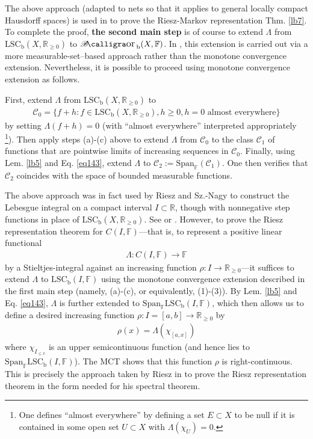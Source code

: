 \documentclass[12pt,b5paper,notitlepage]{article}
\theoremstyle{definition}
\theoremstyle{plain}
\DeclareMathOperator{\Borb}{{\mathscr{B}\text{\kern -2pt {\calligra\large or}}\,}_{\mathrm b}}
\newcommand{\Span}{\mathrm{Span}}
\newcommand{\scr}{\mathscr}
\newcommand{\Rbb}{\mathbb R}
\newcommand{\Fbb}{\mathbb F}
\newcommand{\LSCb}{\mathrm{LSC}_{\mathrm b}}
\numberwithin{equation}{section}
\begin{document}
The above approach (adapted to nets so that it applies to general locally compact Hausdorff spaces) is used in \cite[Ch. 25]{Gui-A} to prove the Riesz-Markov representation Thm. \ref{lb7}. To complete the proof, \textbf{the second main step} is of course to extend $\Lambda$ from $\LSCb(X,\Rbb_{\geq0})$ to $\Borb(X,\Fbb)$. In \cite{Gui-A}, this extension is carried out via a more measurable-set--based approach rather than the monotone convergence extension. Nevertheless, it is possible to proceed using monotone convergence extension as follows. 

First, extend $\Lambda$ from $\LSCb(X,\Rbb_{\geq0})$ to
\begin{align*}
\scr C_0=\{f+h:f\in\LSCb(X,\Rbb_{\geq0}),h\geq0,h=0\text{ almost everywhere}\}
\end{align*}
by setting $\Lambda(f+h)=0$ (with ``almost everywhere'' interpreted appropriately \footnote{One defines ``almost everywhere'' by defining a set $E\subset X$ to be null if it is contained in some open set $U\subset X$ with $\Lambda(\chi_U)=0$.}). Then apply steps (a)-(c) above to extend $\Lambda$ from $\scr C_0$ to the class $\scr C_1$ of functions that are pointwise limits of increasing sequences in $\scr C_0$. Finally, using Lem. \ref{lb5} and Eq. \eqref{eq143}, extend $\Lambda$ to $\scr C_2:=\Span_\Fbb(\scr C_1)$. One then verifies that $\scr C_2$ coincides with the space of bounded measurable functions. 


The above approach was in fact used by Riesz and Sz.-Nagy to construct the Lebesgue integral on a compact interval $I\subset\Rbb$, though with nonnegative step functions in place of $\LSCb(X,\Rbb_{\geq0})$. See \cite[Sec. 16-22]{RN} or \cite[Ch. 10]{Apo}. However, to prove the Riesz representation theorem for $C(I,\Fbb)$---that is, to represent a positive linear functional
\begin{align*}
\Lambda:C(I,\Fbb)\rightarrow\Fbb
\end{align*}
by a Stieltjes-integral against an increasing function $\rho:I\rightarrow\Rbb_{\geq0}$---it suffices to extend $\Lambda$ to $\LSCb(I,\Fbb)$ using the monotone convergence extension described in the first main step (namely, (a)-(c), or equivalently, (1)-(3)). By Lem. \ref{lb5} and Eq. \eqref{eq143}, $\Lambda$ is further extended to $\Span_\Fbb\LSCb(I,\Fbb)$, which then allows us to define a desired increasing function $\rho:I=[a,b]\rightarrow\Rbb_{\geq0}$ by
\begin{align*}
\rho(x)=\Lambda(\chi_{[a,x]})
\end{align*}
where $\chi_{I_{\leq x}}$ is an upper semicontinuous function (and hence lies to $\Span_\Fbb\LSCb(I,\Fbb)$). The MCT shows that this function $\rho$ is right-continuous. This is precisely the approach taken by Riesz in \cite{Rie13} to prove the Riesz representation theorem in the form needed for his spectral theorem.
\end{document}

